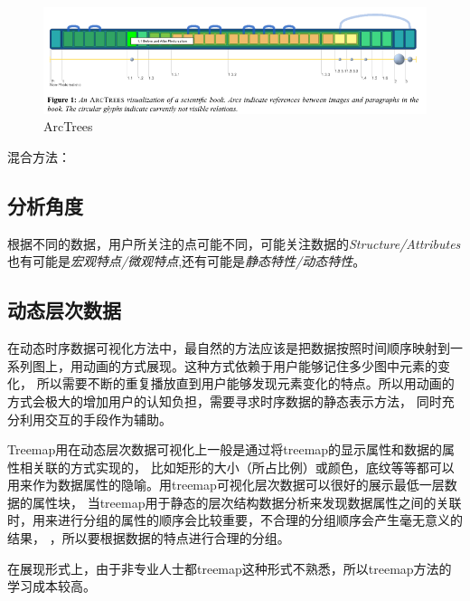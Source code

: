 \documentclass{article}
\begin{document}
\begin{figure}[h]
	\centering
	\includegraphics[width=\textwidth]{_img/ArcTrees_.png}
	\caption{ArcTrees\cite{neumann2005arctrees}}
	\label{fig:arctrees}
\end{figure}

混合方法：

\subsection{分析角度}
根据不同的数据，用户所关注的点可能不同，可能关注数据的\emph{Structure/Attributes}
也有可能是\emph{宏观特点/微观特点},还有可能是\emph{静态特性/动态特性}。

\subsection{动态层次数据}
在动态时序数据可视化方法中，最自然的方法应该是把数据按照时间顺序映射到一系列图上，用动画的方式展现。这种方式依赖于用户能够记住多少图中元素的变化，
所以需要不断的重复播放直到用户能够发现元素变化的特点。所以用动画的方式会极大的增加用户的认知负担，需要寻求时序数据的静态表示方法，
同时充分利用交互的手段作为辅助。

Treemap用在动态层次数据可视化上一般是通过将treemap的显示属性和数据的属性相关联的方式实现的，
比如矩形的大小（所占比例）或颜色，底纹等等都可以用来作为数据属性的隐喻。用treemap可视化层次数据可以很好的展示最低一层数据的属性块，
当treemap用于静态的层次结构数据分析来发现数据属性之间的关联时，用来进行分组的属性的顺序会比较重要，不合理的分组顺序会产生毫无意义的结果，
，所以要根据数据的特点进行合理的分组。


在展现形式上，由于非专业人士都treemap这种形式不熟悉，所以treemap方法的学习成本较高。\cite{STASKO2000}
\end{document}

